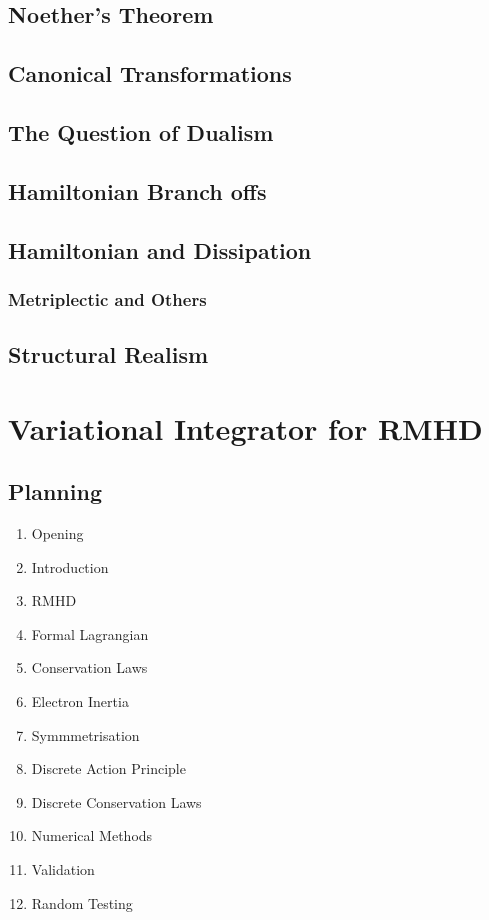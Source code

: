 \subsection{Noether's Theorem}


\subsection{Canonical Transformations}

\subsection{The Question of Dualism}

\subsection{Hamiltonian Branch offs}

\subsection{Hamiltonian and Dissipation}

\subsubsection{Metriplectic and Others}

\subsection{Structural Realism}
\section{Variational Integrator for RMHD}

\subsection{Planning}
\begin{enumerate}
	\item Opening
	\item Introduction
	\item RMHD
	\item Formal Lagrangian
	\item Conservation Laws
	\item Electron Inertia
	\item Symmmetrisation
	\item Discrete Action Principle
	\item Discrete Conservation Laws
	\item Numerical Methods
	\item Validation
	\item Random Testing
\end{enumerate}

